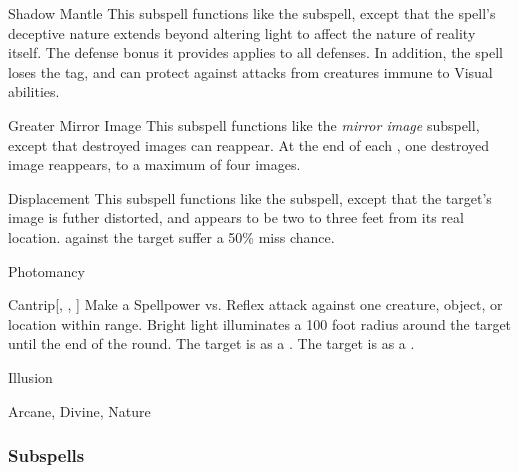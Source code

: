 \begin{ability}[\nth{4}]{Shadow Mantle}
This subspell functions like the  subspell, except that the spell's deceptive nature extends beyond altering light to affect the nature of reality itself.
The defense bonus it provides applies to all defenses.
In addition, the spell loses the  tag, and can protect against attacks from creatures immune to Visual abilities.
\end{ability}
\vspace{0.25em}


\begin{ability}[\nth{5}]{Greater Mirror Image}
This subspell functions like the \textit{mirror image} subspell, except that destroyed images can reappear.
At the end of each , one destroyed image reappears, to a maximum of four images.
\end{ability}
\vspace{0.25em}


\begin{ability}[\nth{7}]{Displacement}
This subspell functions like the  subspell, except that the target's image is futher distorted, and appears to be two to three feet from its real location.
  against the target suffer a 50\% miss chance.
\end{ability}
\vspace{0.25em}

\newpage
\begin{spellsection}{Photomancy}


\begin{ability}{Cantrip}[, , ]
Make a Spellpower vs. Reflex attack against one creature, object, or location within \rngmed range.
Bright light illuminates a 100 foot radius around the target until the end of the round.
\hit The target is \dazzled as a .
\crit The target is \blinded as a .
\end{ability}




 Illusion

 Arcane, Divine, Nature
\end{spellsection}


\subsubsection{Subspells}


